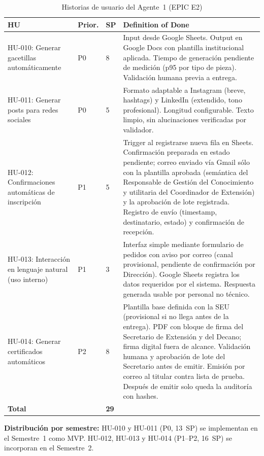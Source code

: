 \documentclass[a4paper, 12pt]{article}
\begin{document}
\begin{table}[H]
  \centering
  \caption{Historias de usuario del Agente~1 (EPIC E2)}
  \label{tab:hu}
  \footnotesize
  \begin{tabularx}{\textwidth}{L{0.22\textwidth}C{0.10\textwidth}C{0.05\textwidth}Y}
    \toprule
    \textbf{HU} & \textbf{Prior.} & \textbf{SP} & \textbf{Definition of Done} \\
    \midrule
    HU-010: Generar gacetillas autom\'aticamente & P0 & 8 & Input desde Google Sheets. Output en Google Docs con plantilla institucional aplicada. Tiempo de generaci\'on pendiente de medici\'on (p95 por tipo de pieza). Validaci\'on humana previa a entrega. \\
    HU-011: Generar posts para redes sociales & P0 & 5 & Formato adaptable a Instagram (breve, hashtags) y LinkedIn (extendido, tono profesional). Longitud configurable. Texto limpio, sin alucinaciones verificadas por validador. \\
    HU-012: Confirmaciones autom\'aticas de inscripci\'on & P1 & 5 & Trigger al registrarse nueva fila en Sheets. Confirmaci\'on preparada en estado pendiente; correo enviado v\'ia Gmail s\'olo con la plantilla aprobada (sem\'antica del Responsable de Gesti\'on del Conocimiento y utilitaria del Coordinador de Extensi\'on) y la aprobaci\'on de lote registrada. Registro de env\'io (timestamp, destinatario, estado) y confirmaci\'on de recepci\'on. \\
    HU-013: Interacci\'on en lenguaje natural (uso interno) & P1 & 3 & Interfaz simple mediante formulario de pedidos con aviso por correo (canal provisional, pendiente de confirmaci\'on por Direcci\'on). Google Sheets registra los datos requeridos por el sistema. Respuesta generada usable por personal no t\'ecnico. \\
    HU-014: Generar certificados autom\'aticos & P2 & 8 & Plantilla base definida con la SEU (provisional si no llega antes de la entrega). PDF con bloque de firma del Secretario de Extensi\'on y del Decano; firma digital fuera de alcance. Validaci\'on humana y aprobaci\'on de lote del Secretario antes de emitir. Emisi\'on por correo al titular contra lista de prueba. Despu\'es de emitir solo queda la auditor\'ia con hashes. \\
    \midrule
    \textbf{Total} & & \textbf{29} & \\
    \bottomrule
  \end{tabularx}
\end{table}

\textbf{Distribuci\'on por semestre:} HU-010 y HU-011 (P0, 13~SP) se implementan en el Semestre~1 como \ac{MVP}. HU-012, HU-013 y HU-014 (P1--P2, 16~SP) se incorporan en el Semestre~2.
\end{document}
